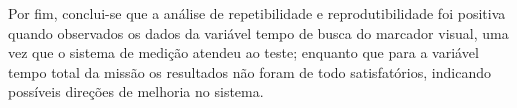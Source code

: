 Por fim, conclui-se que a análise de repetibilidade e reprodutibilidade foi positiva quando observados os dados da variável tempo de busca do marcador visual, uma vez que o sistema de medição atendeu ao teste; enquanto que para a variável tempo total da missão os resultados não foram de todo satisfatórios, indicando possíveis direções de melhoria no sistema. 





